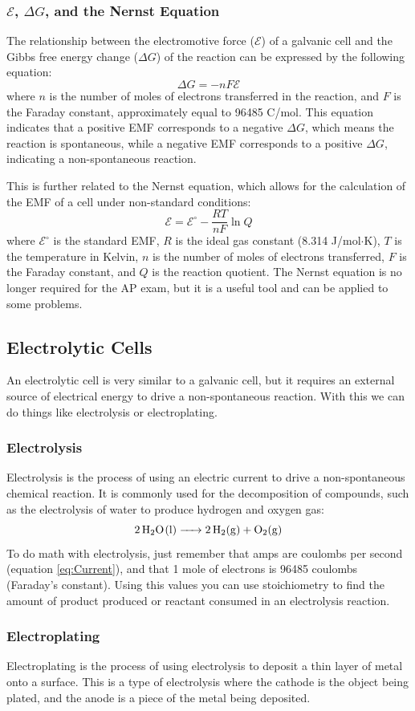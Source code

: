 \subsubsection{$\mathcal{E}$, $\Delta G$, and the Nernst Equation}
The relationship between the electromotive force ($\mathcal{E}$) of a galvanic cell and the Gibbs free energy change ($\Delta G$) of the reaction can be expressed by the following equation:
\begin{equation}\label{eq:EMF_DeltaG}
\Delta G = -nF\mathcal{E}
\end{equation}
where $n$ is the number of moles of electrons transferred in the reaction, and $F$ is the Faraday constant, approximately equal to 96485 C/mol. This equation indicates that a positive EMF corresponds to a negative $\Delta G$, which means the reaction is spontaneous, while a negative EMF corresponds to a positive $\Delta G$, indicating a non-spontaneous reaction. 

This is further related to the Nernst equation, which allows for the calculation of the EMF of a cell under non-standard conditions:
\begin{equation}\label{eq:Nernst}
\mathcal{E} = \mathcal{E}^\circ - \frac{RT}{nF} \ln Q
\end{equation}
where $\mathcal{E}^\circ$ is the standard EMF, $R$ is the ideal gas constant (8.314 J/mol$\cdot$K), $T$ is the temperature in Kelvin, $n$ is the number of moles of electrons transferred, $F$ is the Faraday constant, and $Q$ is the reaction quotient. The Nernst equation is no longer required for the AP exam, but it is a useful tool and can be applied to some problems.
\subsection{Electrolytic Cells}
An electrolytic cell is very similar to a galvanic cell, but it requires an external source of electrical energy to drive a non-spontaneous reaction. With this we can do things like electrolysis or electroplating.
\subsubsection{Electrolysis}
Electrolysis is the process of using an electric current to drive a non-spontaneous chemical reaction. It is commonly used for the decomposition of compounds, such as the electrolysis of water to produce hydrogen and oxygen gas:
\[\ce{2H2O(l) -> 2H2(g) + O2(g)}\]
To do math with electrolysis, just remember that amps are coulombs per second (equation \eqref{eq:Current}), and that 1 mole of electrons is 96485 coulombs (Faraday's constant). Using this values you can use stoichiometry to find the amount of product produced or reactant consumed in an electrolysis reaction. 
\subsubsection{Electroplating}
Electroplating is the process of using electrolysis to deposit a thin layer of metal onto a surface. This is a type of electrolysis where the cathode is the object being plated, and the anode is a piece of the metal being deposited. 